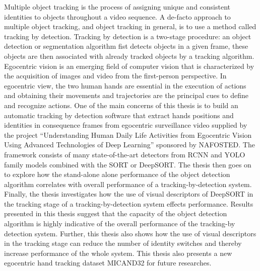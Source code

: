 % 
% 
%
Multiple object tracking is the process of assigning unique and consistent identities to objects throughout a video sequence. A de-facto approach to multiple object tracking, and object tracking in general, is to use a method called tracking by detection. Tracking by detection is a two-stage procedure: an object detection or segmentation algorithm fist detects objects in a given frame, these objects are then associated with already tracked objects by a tracking algorithm. Egocentric vision is an emerging field of computer vision that is characterized by the acquisition of images and video from the first-person perspective. In egocentric view, the two human hands are essential in the execution of actions and obtaining their movements and trajectories are the principal cues to define and recognize actions.
One of the main concerns of this thesis is to build an automatic tracking by detection software that extract hands positions and identities in consequence frames from egocentric surveillance video supplied by the project “Understanding Human Daily Life Activities from Egocentric Vision Using Advanced Technologies of Deep Learning” sponsored by NAFOSTED. The framework consists of many state-of-the-art detectors from RCNN and YOLO family models combined with the SORT or DeepSORT. The thesis then goes on to explore how the stand-alone alone performance of the object detection algorithm correlates with overall performance of a tracking-by-detection system. Finally, the thesis investigates how the use of visual descriptors of DeepSORT in the tracking stage of a tracking-by-detection system effects performance.
Results presented in this thesis suggest that the capacity of the object detection algorithm is highly indicative of the overall performance of the tracking-by detection system. Further, this thesis also shows how the use of visual descriptors in the tracking stage can reduce the number of identity switches and thereby increase performance of the whole system. This thesis also presents a new egocentric hand tracking dataset MICAND32 for future researches.

